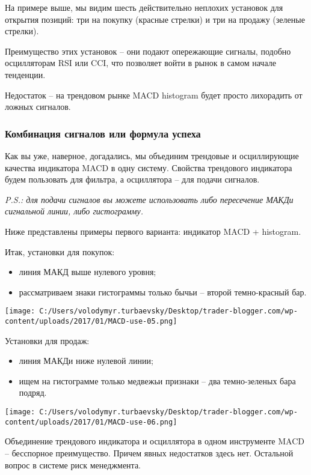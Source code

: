 \documentclass[a5paper]{article}
\begin{document}
На примере выше, мы видим шесть действительно неплохих установок для открытия позиций: три на покупку (красные стрелки) и три на продажу (зеленые стрелки).

Преимущество этих установок – они подают опережающие сигналы, подобно осцилляторам RSI или CCI, что позволяет войти в рынок в самом начале тенденции.

Недостаток – на трендовом рынке MACD histogram будет просто лихорадить
от ложных сигналов.

\subsubsection{Комбинация сигналов или формула успеха}

Как вы уже, наверное, догадались, мы объединим трендовые и осциллирующие качества индикатора MACD в одну систему. Свойства трендового индикатора будем пользовать для фильтра, а осциллятора – для подачи сигналов.

    \emph{P.S.: для подачи сигналов вы можете использовать либо пересечение МАКДи сигнальной линии, либо гистограмму.}

Ниже представлены примеры первого варианта: индикатор MACD + histogram.

Итак, установки для покупок:
\begin{itemize}
\item     линия МАКД выше нулевого уровня;
\item     рассматриваем знаки гистограммы только бычьи – второй темно-красный бар.
\end{itemize}

\texttt{[image: C:/Users/volodymyr.turbaevsky/Desktop/trader-blogger.com/wp-content/uploads/2017/01/MACD-use-05.png]}

Установки для продаж:
\begin{itemize}
\item     линия МАКДи ниже нулевой линии;
\item     ищем на гистограмме только медвежьи признаки – два темно-зеленых бара подряд.
  \end{itemize}

\texttt{[image: C:/Users/volodymyr.turbaevsky/Desktop/trader-blogger.com/wp-content/uploads/2017/01/MACD-use-06.png]}

Объединение трендового индикатора и осциллятора в одном инструменте MACD – бесспорное преимущество. Причем явных недостатков здесь нет. Остальной вопрос в системе риск менеджмента.
\end{document}
